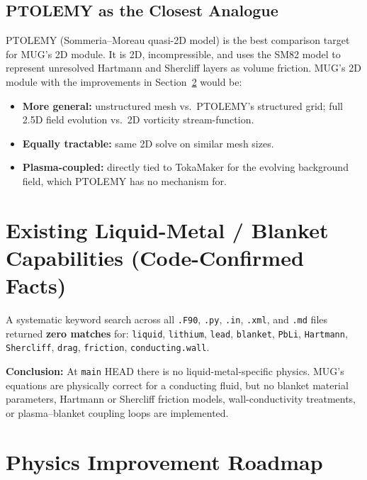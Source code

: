 \documentclass[11pt,letterpaper]{article}
\begin{document}
\subsection{PTOLEMY as the Closest Analogue}

PTOLEMY (Sommeria--Moreau quasi-2D model) is the best comparison target for
MUG's 2D module.  It is 2D, incompressible, and uses the SM82 model to
represent unresolved Hartmann and Shercliff layers as volume friction.  MUG's
2D module with the improvements in Section~\ref{sec:roadmap} would be:
\begin{itemize}
  \item \textbf{More general:} unstructured mesh vs.\ PTOLEMY's structured grid;
    full 2.5D field evolution vs.\ 2D vorticity stream-function.
  \item \textbf{Equally tractable:} same 2D solve on similar mesh sizes.
  \item \textbf{Plasma-coupled:} directly tied to TokaMaker for the evolving
    background field, which PTOLEMY has no mechanism for.
\end{itemize}

\section{Existing Liquid-Metal / Blanket Capabilities (Code-Confirmed Facts)}

A systematic keyword search across all \texttt{.F90}, \texttt{.py},
\texttt{.in}, \texttt{.xml}, and \texttt{.md} files returned \textbf{zero
matches} for: \texttt{liquid}, \texttt{lithium}, \texttt{lead},
\texttt{blanket}, \texttt{PbLi}, \texttt{Hartmann}, \texttt{Shercliff},
\texttt{drag}, \texttt{friction}, \texttt{conducting.wall}.

\textbf{Conclusion:} At \texttt{main} HEAD there is no liquid-metal-specific
physics.  MUG's equations are physically correct for a conducting fluid, but no
blanket material parameters, Hartmann or Shercliff friction models,
wall-conductivity treatments, or plasma--blanket coupling loops are implemented.

\section{Physics Improvement Roadmap}
\label{sec:roadmap}
\end{document}
